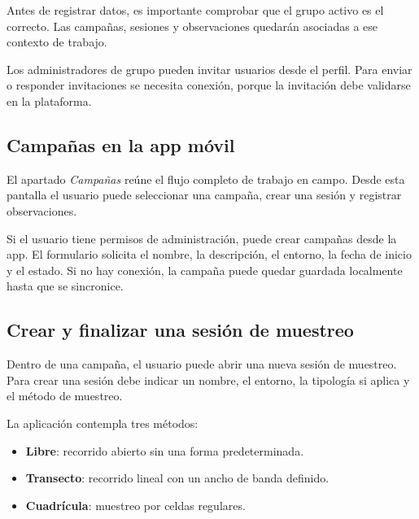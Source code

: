 Antes de registrar datos, es importante comprobar que el grupo activo es el correcto.
Las campañas, sesiones y observaciones quedarán asociadas a ese contexto de trabajo.

Los administradores de grupo pueden invitar usuarios desde el perfil. Para enviar o
responder invitaciones se necesita conexión, porque la invitación debe validarse en
la plataforma.

\subsection{Campañas en la app móvil}

El apartado \textit{Campañas} reúne el flujo completo de trabajo en campo. Desde esta
pantalla el usuario puede seleccionar una campaña, crear una sesión y registrar
observaciones.


Si el usuario tiene permisos de administración, puede crear campañas desde la app.
El formulario solicita el nombre, la descripción, el entorno, la fecha de inicio y
el estado. Si no hay conexión, la campaña puede quedar guardada localmente hasta que
se sincronice.


\subsection{Crear y finalizar una sesión de muestreo}

Dentro de una campaña, el usuario puede abrir una nueva sesión de muestreo. Para
crear una sesión debe indicar un nombre, el entorno, la tipología si aplica y el
método de muestreo.

La aplicación contempla tres métodos:

\begin{itemize}[leftmargin=1.5em]
  \item \textbf{Libre}: recorrido abierto sin una forma predeterminada.
  \item \textbf{Transecto}: recorrido lineal con un ancho de banda definido.
  \item \textbf{Cuadrícula}: muestreo por celdas regulares.
\end{itemize}

